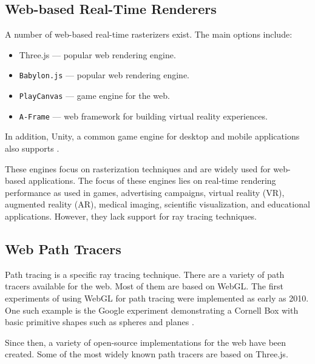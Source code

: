 \subsection*{Web-based Real-Time Renderers}

A number of web-based real-time rasterizers exist. The main options include:

\begin{itemize}
  \item {\gls{Three.js}} \cite{threeJSWebsite} — popular web rendering engine.
  \item {\texttt{Babylon.js}} \cite{babylonJSWebsite} — popular web rendering engine.
  \item {\texttt{PlayCanvas}} \cite{playCanvasWebsite} — game engine for the web.
  \item {\texttt{A-Frame}} \cite{aFrameWebsite} — web framework for building virtual reality experiences.
\end{itemize}

In addition, \gls{Unity}, a common game engine for desktop and mobile applications also supports  \cite{unityWebGLCompatibility}.

These engines focus on rasterization techniques and are widely used for web-based applications. The focus of these engines lies on real-time rendering performance as used in games, advertising campaigns, virtual reality (VR), augmented reality (AR), medical imaging, scientific visualization, and educational applications. However, they lack support for ray tracing techniques. 

\subsection*{Web Path Tracers}

Path tracing is a specific ray tracing technique. There are a variety of path tracers available for the web. Most of them are based on \gls{WebGL}. The first experiments of using \gls{WebGL} for path tracing were implemented as early as 2010. One such example is the Google experiment demonstrating a Cornell Box \cite{goral1984modeling} with basic primitive shapes such as spheres and planes \cite{pathTracerWallace}.

Since then, a variety of open-source implementations for the web have been created. Some of the most widely known path tracers are based on \gls{Three.js}.

